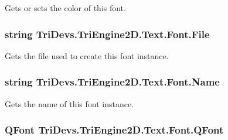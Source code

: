 Gets or sets the color of this font. 

\hypertarget{class_tri_devs_1_1_tri_engine2_d_1_1_text_1_1_font_a9a452edb5662bf9ad60ccb4896417565}{
\subsubsection[{File}]{\setlength{\rightskip}{0pt plus 5cm}string Tri\-Devs.\-Tri\-Engine2\-D.\-Text.\-Font.\-File\hspace{0.3cm}{\ttfamily [get]}}}\label{class_tri_devs_1_1_tri_engine2_d_1_1_text_1_1_font_a9a452edb5662bf9ad60ccb4896417565}


Gets the file used to create this font instance. 

\hypertarget{class_tri_devs_1_1_tri_engine2_d_1_1_text_1_1_font_af6d31c9d2a35759ce7c2c6432fd34955}{
\subsubsection[{Name}]{\setlength{\rightskip}{0pt plus 5cm}string Tri\-Devs.\-Tri\-Engine2\-D.\-Text.\-Font.\-Name\hspace{0.3cm}{\ttfamily [get]}}}\label{class_tri_devs_1_1_tri_engine2_d_1_1_text_1_1_font_af6d31c9d2a35759ce7c2c6432fd34955}


Gets the name of this font instance. 

\hypertarget{class_tri_devs_1_1_tri_engine2_d_1_1_text_1_1_font_a019de011e935ea9017eb805ff778581a}{
\subsubsection[{Q\-Font}]{\setlength{\rightskip}{0pt plus 5cm}Q\-Font Tri\-Devs.\-Tri\-Engine2\-D.\-Text.\-Font.\-Q\-Font\hspace{0.3cm}{\ttfamily [get]}}}\label{class_tri_devs_1_1_tri_engine2_d_1_1_text_1_1_font_a019de011e935ea9017eb805ff778581a}


